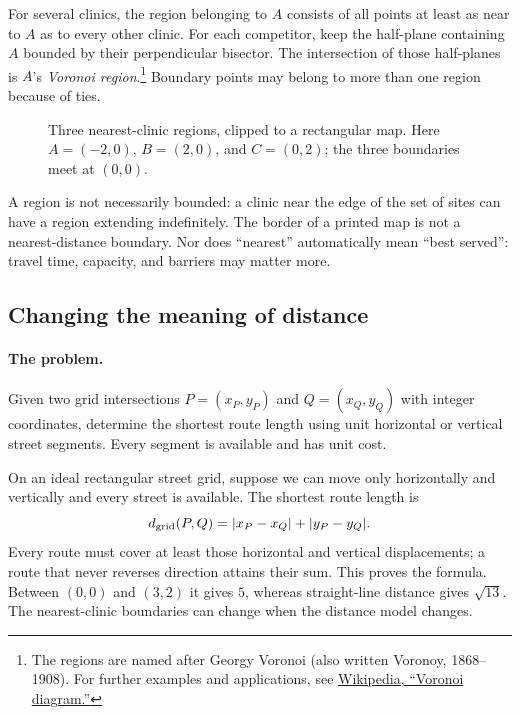 For several clinics, the region belonging to $A$ consists of all points
at least as near to $A$ as to every other clinic. For each competitor,
keep the half-plane containing $A$ bounded by their perpendicular bisector.
The intersection of those half-planes is $A$'s \emph{Voronoi region}.\footnote{The regions are named after Georgy Voronoi (also written Voronoy, 1868--1908).
For further examples and applications, see
\href{https://en.wikipedia.org/wiki/Voronoi_diagram}{Wikipedia, ``Voronoi diagram.''}}
Boundary points may belong to more than one region because of ties.

\begin{figure}[htbp]\centering
{}
\caption{Three nearest-clinic regions, clipped to a rectangular map. Here $A=(-2,0)$, $B=(2,0)$, and $C=(0,2)$; the three boundaries meet at $(0,0)$.}
\label{fig:geo-voronoi}
\end{figure}

A region is not necessarily bounded: a clinic near the edge of the set of
sites can have a region extending indefinitely. The border of a printed
map is not a nearest-distance boundary. Nor does ``nearest'' automatically
mean ``best served'': travel time, capacity, and barriers may matter more.

\subsection{Changing the meaning of distance}
\paragraph{The problem.}
Given two grid intersections $P=(x_P,y_P)$ and $Q=(x_Q,y_Q)$ with integer
coordinates, determine the shortest route length using unit horizontal
or vertical street segments. Every segment is available and has unit cost.

On an ideal rectangular street grid, suppose we can move only horizontally
and vertically and every street is available. The shortest route length is
\[
d_{\rm grid}(P,Q)=|x_P-x_Q|+|y_P-y_Q|.
\]
Every route must cover at least those horizontal and vertical displacements;
a route that never reverses direction attains their sum. This proves the
formula. Between $(0,0)$ and $(3,2)$ it gives $5$, whereas straight-line
distance gives $\sqrt{13}$. The nearest-clinic boundaries can change when
the distance model changes.

